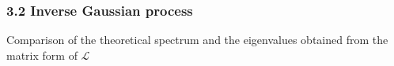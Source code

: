 \documentclass{beamer}
\begin{document}
\begin{frame}
\frametitle{3.2 Inverse Gaussian process}
Comparison of the theoretical spectrum and the eigenvalues obtained from the matrix form of $\mathcal{L}$
\begin{figure}
	\centering
	\\
	
	\vspace{1cm}
\end{figure}

\end{frame}
\end{document}
